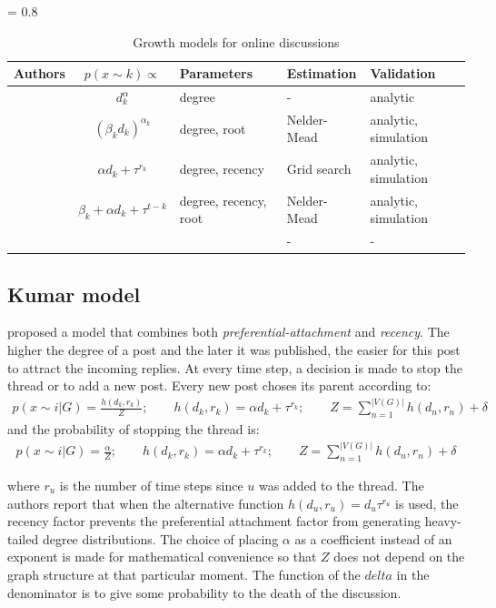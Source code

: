 \documentclass[smallextended]{svjour3}          %
\begin{document}
\begin{table}
 \begin{center}
   \tabcolsep = 0.8\tabcolsep
   \begin{tabular}{|l|c|l|l|l|}
      \hline
     	 Authors				& $p(x \sim k) \propto$ &Parameters & Estimation & Validation\\
   \hline 
\cite{Barabasi1999} & $d_k^\alpha$  & degree & - &  analytic\\
\cite{Gomez2010} & $(\beta_k d_{k})^{\alpha_k}$ & degree, root & Nelder-Mead & analytic, simulation\\
\cite{Kumar2010} & $\alpha d_k + \tau^{r_k}$ & degree, recency & Grid search &  analytic, simulation \\      
\cite{Gomez2012} & $\beta_k + \alpha d_k + \tau^{t-k}$ & degree, recency, root & Nelder-Mead &  analytic, simulation\\
\cite{Wang2012e} & & &- & -\\
   \hline
   \end{tabular}
\label{tab:growth_models}
 \end{center}
 \caption{Growth models for online discussions}
\end{table}

\subsection{Kumar model}
\cite{Kumar2010} proposed a model that combines both \textit{preferential-attachment} and \textit{recency}. The higher the degree of a post and the later it was published, the easier for this post to attract the incoming replies. At every time step, a decision is made to stop the thread or to add a new post. Every new post choses its parent according to:
\begin{align}
p(x\sim i | G) = \frac{h(d_k, r_k)}{Z}; \qquad h(d_k, r_k) =\alpha d_k + \tau^{r_k} ; \qquad Z = \sum_{n=1}^{|V(G)|} h(d_n, r_n) + \delta
\end{align}
and the probability of stopping the thread is:
\begin{align}
p(x\sim i | G) = \frac{\alpha}{Z}; \qquad h(d_k, r_k) =\alpha d_k + \tau^{r_k} ; \qquad Z = \sum_{n=1}^{|V(G)|} h(d_n, r_n) + \delta
\end{align}



where $r_u$ is the number of time steps since $u$ was added to the thread. The authors report that when the alternative function $h(d_u, r_u) = d_u \tau^{r_u}$ is used, the recency factor prevents the preferential attachment factor from generating heavy-tailed degree distributions. The choice of placing $\alpha$ as a coefficient instead of an exponent is made for mathematical convenience so that $Z$ does not depend on the graph structure at that particular moment. The function of the $delta$ in the denominator is to give some probability to the death of the discussion. 
\end{document}
